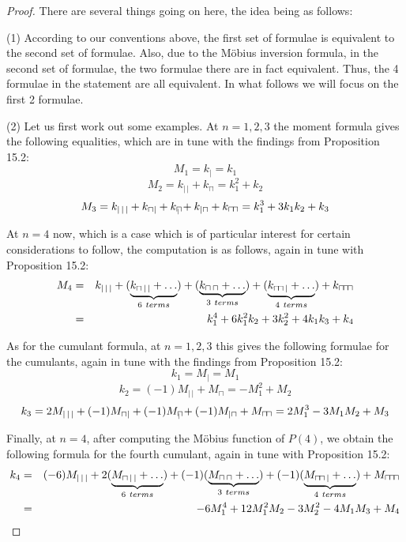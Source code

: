 \documentclass[12pt]{amsbook}
\begin{document}
\begin{proof}
There are several things going on here, the idea being as follows:

\medskip

(1) According to our conventions above, the first set of formulae is equivalent to the second set of formulae. Also, due to the M\"obius inversion formula, in the second set of formulae, the two formulae there are in fact equivalent. Thus, the 4 formulae in the statement are all equivalent. In what follows we will focus on the first 2 formulae.

\medskip

(2) Let us first work out some examples. At $n=1,2,3$ the moment formula gives the following equalities, which are in tune with the findings from Proposition 15.2:
$$M_1=k_|=k_1$$
$$M_2=k_{|\,|}+k_\sqcap=k_1^2+k_2$$
$$M_3=k_{|\,|\,|}+k_{\sqcap|}+k_{\sqcap\hskip-2.8mm{\ }_|}+k_{|\sqcap}+k_{\sqcap\hskip-0.5mm\sqcap}=k_1^3+3k_1k_2+k_3$$

At $n=4$ now, which is a case which is of particular interest for certain considerations to follow, the computation is as follows, again in tune with Proposition 15.2:
\begin{eqnarray*}
M_4
&=&k_{|\,|\,|}+(\underbrace{k_{\sqcap\,|\,|}+\ldots}_{6\ terms})+(\underbrace{k_{\sqcap\,\sqcap}+\ldots}_{3\ terms})+(\underbrace{k_{\sqcap\hskip-0.5mm\sqcap\,|}+\ldots}_{4\ terms})+k_{\sqcap\hskip-0.5mm\sqcap\hskip-0.5mm\sqcap}\\
&=&k_1^4+6k_1^2k_2+3k_2^2+4k_1k_3+k_4
\end{eqnarray*}

As for the cumulant formula, at $n=1,2,3$ this gives the following formulae for the cumulants, again in tune with the findings from Proposition 15.2:
$$k_1=M_|=M_1$$
$$k_2=(-1)M_{|\,|}+M_\sqcap=-M_1^2+M_2$$
$$k_3=2M_{|\,|\,|}+(-1)M_{\sqcap|}+(-1)M_{\sqcap\hskip-2.8mm{\ }_|}+(-1)M_{|\sqcap}+M_{\sqcap\hskip-0.5mm\sqcap}=2M_1^3-3M_1M_2+M_3$$

Finally, at $n=4$, after computing the M\"obius function of $P(4)$, we obtain the following formula for the fourth cumulant, again in tune with Proposition 15.2:
\begin{eqnarray*}
k_4
&=&(-6)M_{|\,|\,|}+2(\underbrace{M_{\sqcap\,|\,|}+\ldots}_{6\ terms})+(-1)(\underbrace{M_{\sqcap\,\sqcap}+\ldots}_{3\ terms})+(-1)(\underbrace{M_{\sqcap\hskip-0.5mm\sqcap\,|}+\ldots}_{4\ terms})+M_{\sqcap\hskip-0.5mm\sqcap\hskip-0.5mm\sqcap}\\
&=&-6M_1^4+12M_1^2M_2-3M_2^2-4M_1M_3+M_4
\end{eqnarray*}


\end{proof}
\end{document}
